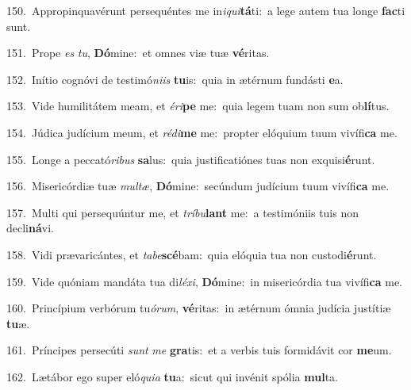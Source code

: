 {\numbfont\textcolor{\numbcolor}{150.}}~Appropinquavérunt persequéntes me in\-\textit{i}\-\textit{qui}\textbf{tá}ti:~\star a lege autem tua longe \textbf{fac}\-ti sunt.\par
{\numbfont\textcolor{\numbcolor}{151.}}~Prope \textit{es} \textit{tu}\-, \textbf{Dó}\-mine:~\star et omnes viæ tuæ \textbf{vé}\-ritas.\par
{\numbfont\textcolor{\numbcolor}{152.}}~Inítio cognóvi de testimó\-\textit{ni}\-\textit{is} \textbf{tu}\-is:~\star quia in ætérnum fundásti \textbf{e}\-a.\par
{\numbfont\textcolor{\numbcolor}{153.}}~Vide humilitátem meam, et \textit{é}\-\textit{ri}\textbf{pe} me:~\star quia legem tuam non sum ob\-\textbf{lí}\-tus.\par
{\numbfont\textcolor{\numbcolor}{154.}}~Júdica judícium meum, et \textit{réd}\-\textit{i}\textbf{me} me:~\star propter elóquium tuum vivífi\textbf{ca} me.\par
{\numbfont\textcolor{\numbcolor}{155.}}~Longe a peccató\-\textit{ri}\-\textit{bus} \textbf{sa}\-lus:~\star quia justificatiónes tuas non exquisi\-\textbf{é}\-runt.\par
{\numbfont\textcolor{\numbcolor}{156.}}~Misericórdiæ tuæ \textit{mul}\-\textit{tæ}, \textbf{Dó}\-mine:~\star secúndum judícium tuum vivífi\textbf{ca} me.\par
{\numbfont\textcolor{\numbcolor}{157.}}~Multi qui persequúntur me, et \textit{trí}\-\textit{bu}\textbf{lant} me:~\star a testimóniis tuis non decli\-\textbf{ná}\-vi.\par
{\numbfont\textcolor{\numbcolor}{158.}}~Vidi prævaricántes, et \textit{ta}\-\textit{be}\textbf{scé}bam:~\star quia elóquia tua non custodi\-\textbf{é}\-runt.\par
{\numbfont\textcolor{\numbcolor}{159.}}~Vide quóniam mandáta tua di\-\textit{lé}\-\textit{xi}, \textbf{Dó}\-mine:~\star in misericórdia tua vivífi\textbf{ca} me.\par
{\numbfont\textcolor{\numbcolor}{160.}}~Princípium verbórum tu\-\textit{ó}\-\textit{rum}, \textbf{vé}\-ritas:~\star in ætérnum ómnia judícia justítiæ \textbf{tu}\-æ.\par
{\numbfont\textcolor{\numbcolor}{161.}}~Príncipes persecúti \textit{sunt} \textit{me} \textbf{gra}\-tis:~\star et a verbis tuis formidávit cor \textbf{me}\-um.\par
{\numbfont\textcolor{\numbcolor}{162.}}~Lætábor ego super eló\-\textit{qui}\-\textit{a} \textbf{tu}\-a:~\star sicut qui invénit spólia \textbf{mul}\-ta.\par
